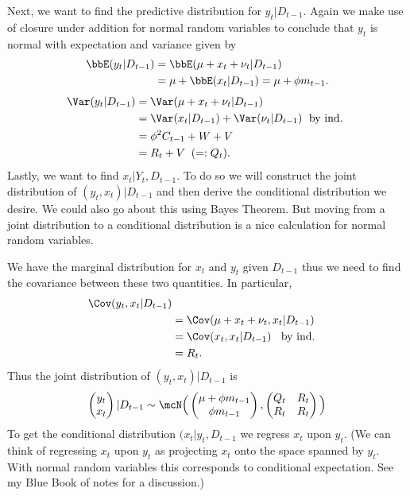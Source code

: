 \documentclass{article}
\begin{document}
Next, we want to find the predictive distribution for $y_t | D_{t-1}$.  Again we make use of closure under addition for normal random variables to conclude that $y_t$ is normal with expectation and variance given by
\begin{align*}
\bbE (y_t | D_{t-1}) 
& = \bbE( \mu + x_t + \nu_t | D_{t-1}) \\
& = \mu + \bbE(x_t | D_{t-1}) = \mu + \phi m_{t-1}.
\end{align*}
\begin{align*}
\Var(y_t | D_{t-1}) 
& = \Var( \mu + x_t + \nu_t | D_{t-1}) \\
& = \Var( x_t | D_{t-1}) + \Var(\nu_t | D_{t-1}) \; \textmd{ by ind. } \\
& = \phi^2 C_{t-1} + W + V \\
& = R_t + V \;\; ( =: Q_t).
\end{align*}
Lastly, we want to find $x_t | Y_t, D_{t-1}$.  To do so we will construct the joint distribution of $(y_t, x_t) | D_{t-1}$ and then derive the conditional distribution we desire.  We could also go about this using Bayes Theorem.  But moving from a joint distribution to a conditional distribution is a nice calculation for normal random variables.

We have the marginal distribution for $x_t$ and $y_t$ given $D_{t-1}$ thus we need to find the covariance between these two quantities.  In particular,
\begin{align*}
\Cov(y_t, x_t | D_{t-1}) \\
& = \Cov(\mu + x_t + \nu_t, x_t | D_{t-1}) \\
& = \Cov(x_t, x_t | D_{t-1}) \;\; \textmd{ by ind.} \\
& = R_t.
\end{align*}
Thus the joint distribution of $(y_t, x_t) | D_{t-1}$ is
\[
\begin{pmatrix}
y_{t} \\
x_{t}
\end{pmatrix} | D_{t-1} 
\sim
\mcN
\Big(
\begin{pmatrix}
\mu + \phi m_{t-1} \\
\phi m_{t-1}
\end{pmatrix} ,
\begin{pmatrix}
Q_t & R_t \\
R_t & R_{t}
\end{pmatrix}
\Big)
\]
To get the conditional distribution $(x_t | y_t, D_{t-1}$ we regress $x_t$ upon $y_t$.  (We can think of regressing $x_t$ upon $y_t$ as projecting $x_t$ onto the space spanned by $y_t$.  With normal random variables this corresponds to conditional expectation.  See my Blue Book of notes for a discussion.)
\end{document}
